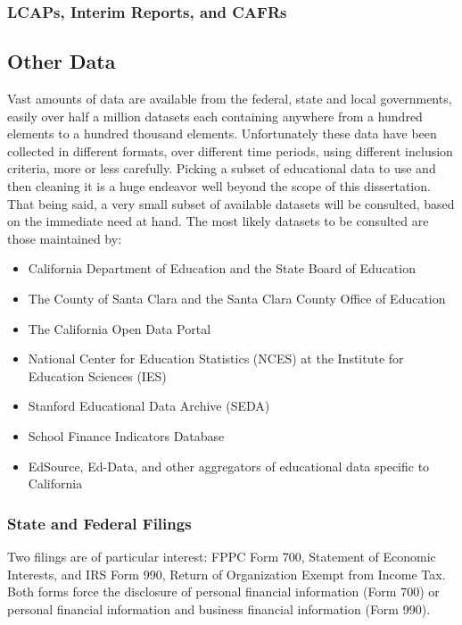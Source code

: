 \subsubsection{LCAPs, Interim Reports, and CAFRs}
\label{sec:lcaps-interim-reports}\indent




\subsection{Other Data}\label{sec:other-data}\indent

Vast amounts of data are available from the federal, state and  local governments, easily over half a million datasets each containing anywhere from a hundred elements to a hundred thousand elements. Unfortunately these data have been collected in different formats, over different time periods, using different inclusion criteria, more or less carefully. Picking a subset of educational data to use and then cleaning it is a huge endeavor well beyond the scope of this dissertation. That being said, a very small subset of available datasets will be consulted, based on the immediate need at hand. The most likely datasets to be consulted are those maintained by:

\begin{itemize}
  \item California Department of Education and the State Board of Education
  \item The County of Santa Clara and the Santa Clara County Office of Education
  \item The California Open Data Portal
  \item National Center for Education Statistics (NCES) at the Institute for Education Sciences (IES)
  \item Stanford Educational Data Archive (SEDA)
  \item School Finance Indicators Database
  \item EdSource, Ed-Data, and other aggregators of educational data specific to California
\end{itemize}

\subsubsection{State and Federal Filings}\label{sec:state-federal-filings}\indent

Two filings are of particular interest: FPPC Form 700, Statement of Economic Interests, and IRS Form 990, Return of Organization Exempt from Income Tax. Both forms force the disclosure of personal financial information (Form 700) or personal financial information and business financial information (Form 990). 

